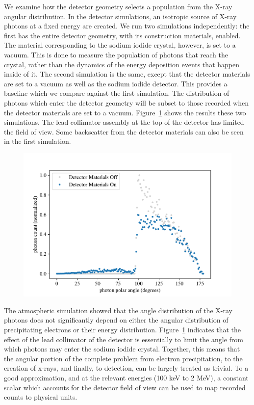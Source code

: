 We examine how the detector geometry selects a population from the X-ray angular distribution. In the detector simulations, an isotropic source of X-ray photons at a fixed energy are created. We run two simulations independently: the first has the entire detector geometry, with its construction materials, enabled. The material corresponding to the sodium iodide crystal, however, is set to a vacuum. This is done to measure the population of photons that reach the crystal, rather than the dynamics of the energy deposition events that happen inside of it. The second simulation is the same, except that the detector materials are set to a vacuum as well as the sodium iodide detector. This provides a baseline which we compare against the first simulation. The distribution of photons which enter the detector geometry will be subset to those recorded when the detector materials are set to a vacuum. Figure~\ref{population_inside_detector} shows the results these two simulations. The lead collimator assembly at the top of the detector has limited the field of view. Some backscatter from the detector materials can also be seen in the first simulation. 

\begin{figure}[p]
\label{population_inside_detector}
\includegraphics[width=\textwidth]{figures/chapter_3/population_inside_detector/population_inside_detector}
\caption{}
\end{figure}

The atmospheric simulation showed that the angle distribution of the X-ray photons does not significantly depend on either the angular distribution of precipitating electrons or their energy distribution. Figure~\ref{population_inside_detector} indicates that the effect of the lead collimator of the detector is essentially to limit the angle from which photons may enter the sodium iodide crystal. Together, this means that the angular portion of the complete problem from electron precipitation, to the creation of x-rays, and finally, to detection, can be largely treated as trivial. To a good approximation, and at the relevant energies (100 keV to 2 MeV), a constant scalar which accounts for the detector field of view can be used to map recorded counts to physical units.

